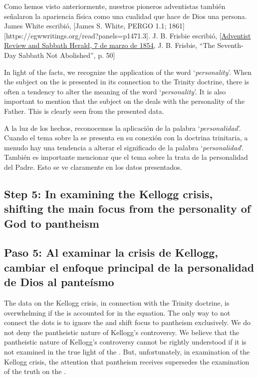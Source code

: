Como hemos visto anteriormente, nuestros pioneros adventistas también señalaron la apariencia física como una cualidad que hace de Dios una persona. James White escribió, [James S. White, PERGO 1.1; 1861][https://egwwritings.org/read?panels=p1471.3]. J. B. Frisbie escribió, [\href{https://documents.adventistarchives.org/Periodicals/RH/RH18540307-V05-07.pdf}{Adventist Review and Sabbath Herald, 7 de marzo de 1854}, J. B. Frisbie, “The Seventh-Day Sabbath Not Abolished”, p. 50]


In light of the facts, we recognize the application of the word ‘\textit{personality}’. When the subject on the  is presented in its connection to the Trinity doctrine, there is often a tendency to alter the meaning of the word ‘\textit{personality}’. It is also important to mention that the subject on the  deals with the personality of the Father. This is clearly seen from the presented data.


A la luz de los hechos, reconocemos la aplicación de la palabra ‘\textit{personalidad}’. Cuando el tema sobre la  se presenta en su conexión con la doctrina trinitaria, a menudo hay una tendencia a alterar el significado de la palabra ‘\textit{personalidad}’. También es importante mencionar que el tema sobre la  trata de la personalidad del Padre. Esto se ve claramente en los datos presentados.


\subsection*{Step 5: In examining the Kellogg crisis, shifting the main focus from the personality of God to pantheism}


\subsection*{Paso 5: Al examinar la crisis de Kellogg, cambiar el enfoque principal de la personalidad de Dios al panteísmo}


The data on the Kellogg crisis, in connection with the Trinity doctrine, is overwhelming if the  is accounted for in the equation. The only way to not connect the dots is to ignore the  and shift focus to pantheism exclusively. We do not deny the pantheistic nature of Kellogg's controversy. We believe that the pantheistic nature of Kellogg's controversy cannot be rightly understood if it is not examined in the true light of the . But, unfortunately, in examination of the Kellogg crisis, the attention that pantheism receives supersedes the examination of the truth on the .


